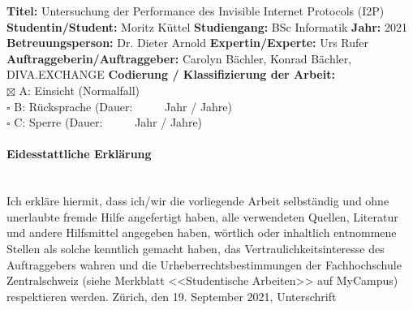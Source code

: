 \fontsize{10.5}{12}
\noindent
\textbf{Titel:} Untersuchung der Performance des Invisible Internet Protocols (I2P)\newline \newline
\textbf{Studentin/Student:} Moritz Küttel \newline \newline
\textbf{Studiengang:} BSc Informatik \newline \newline
\textbf{Jahr:} 2021\newline \newline
\textbf{Betreuungsperson:} Dr. Dieter Arnold \newline \newline
\textbf{Expertin/Experte:} Urs Rufer \newline \newline
\textbf{Auftraggeberin/Auftraggeber:} Carolyn Bächler, Konrad Bächler, DIVA.EXCHANGE\newline \newline \newline
\textbf{Codierung / Klassifizierung der Arbeit:}\\
$\boxtimes$ A: Einsicht   (Normalfall) \\
$\square$ B: R\"ucksprache      (Dauer:  \ \ \ \ \     Jahr / Jahre)\\
$\square$ C: Sperre     (Dauer:  \ \ \ \ \     Jahr / Jahre)\\

\paragraph{\textbf{Eidesstattliche Erkl\"arung}}\\
Ich erkl\"are hiermit, dass ich/wir die vorliegende Arbeit selbst\"andig und ohne unerlaubte fremde Hilfe angefertigt haben, alle verwendeten Quellen, Literatur und andere Hilfsmittel angegeben haben, w\"ortlich oder inhaltlich entnommene Stellen als solche kenntlich gemacht haben, das Vertraulichkeitsinteresse des Auftraggebers wahren und die Urheberrechtsbestimmungen der Fachhochschule Zentralschweiz (siehe Merkblatt <<Studentische Arbeiten>> auf MyCampus) respektieren werden. \newline \newline
Zürich, den 19. September 2021, Unterschrift       \underline{\hspace*{4cm}} \newline \newline



